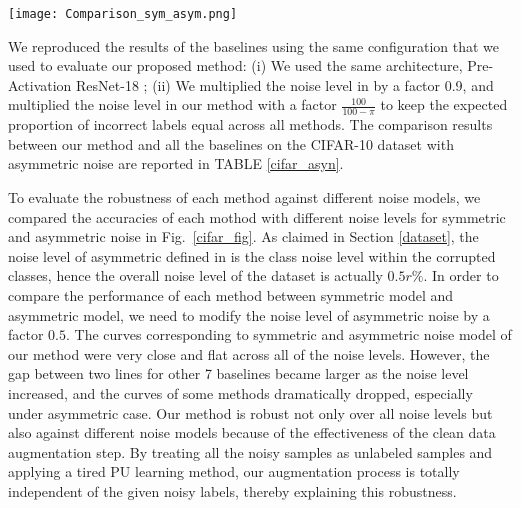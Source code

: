 \documentclass[conference]{IEEEtran}
\begin{document}
\begin{figure*}[tb]
\centering
\texttt{[image: Comparison\_sym\_asym.png]}
\caption{Comparison of the performance of different methods under symmetric noise and asymmetric noise. The noise level here refers to overall noise level within the dataset, e.g. $r\%$ asymmetric noise would correspond to $0.5r\%$ overall noise level. }
\label{cifar_fig}
\end{figure*}





We reproduced the results of the baselines \cite{tanaka2018joint,arazo2019unsupervised,zhang2017mixup,han2018co,wei2020combating, li2020dividemix} using the same configuration that we used to evaluate our proposed method: 
(i) We used the same architecture, Pre-Activation ResNet-18 \cite{he2016identity}; 
(ii) We multiplied the noise level in \cite{han2018co, wei2020combating} by a factor 0.9, and multiplied the noise level in our method with a factor $\frac{100}{100-\pi}$ to keep the expected proportion of incorrect labels equal across all methods. 
The comparison results between our method and all the baselines on the CIFAR-10 dataset with asymmetric noise are reported in TABLE \ref{cifar_asyn}.

To evaluate the robustness of each method against different noise models, we compared the accuracies of each mothod with different noise levels for symmetric and asymmetric noise in \mbox{Fig. \ref{cifar_fig}}. As claimed in Section \ref{dataset}, the noise level of asymmetric defined in \cite{patrini2017making} is the class noise level within the corrupted classes, hence the overall noise level of the dataset is actually $0.5r\%$. In order to compare the performance of each method between symmetric model and asymmetric model, we need to modify the noise level of asymmetric noise by a factor $0.5$. The curves corresponding to symmetric and asymmetric noise model of our method were very close and flat across all of the noise levels. However, the gap between two lines for other 7 baselines became larger as the noise level increased, and the curves of some methods dramatically dropped, especially under asymmetric case. Our method is robust not only over all noise levels but also against different noise models because of the effectiveness of the clean data augmentation step. By treating all the noisy samples as unlabeled samples and applying a tired PU learning method, our augmentation process is totally independent of the given noisy labels, thereby explaining this robustness. 
\end{document}
